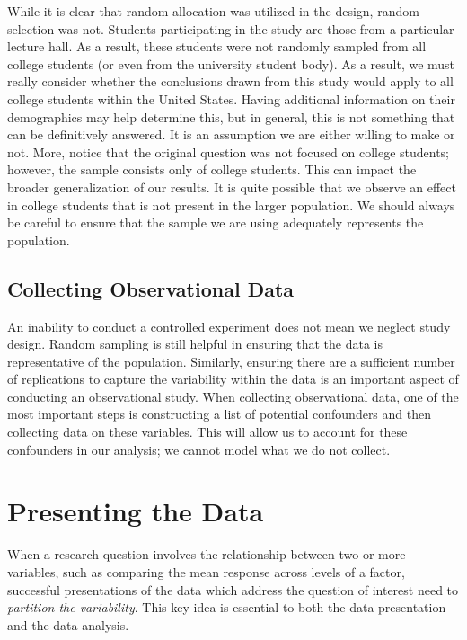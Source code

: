 \documentclass[
]{book}
\theoremstyle{plain}
\theoremstyle{mydefn}
\theoremstyle{myexmpl}
\theoremstyle{remark}
\begin{document}
While it is clear that random allocation was utilized in the design, random selection was not. Students participating in the study are those from a particular lecture hall. As a result, these students were not randomly sampled from all college students (or even from the university student body). As a result, we must really consider whether the conclusions drawn from this study would apply to all college students within the United States. Having additional information on their demographics may help determine this, but in general, this is not something that can be definitively answered. It is an assumption we are either willing to make or not. More, notice that the original question was not focused on college students; however, the sample consists only of college students. This can impact the broader generalization of our results. It is quite possible that we observe an effect in college students that is not present in the larger population. We should always be careful to ensure that the sample we are using adequately represents the population.

\hypertarget{collecting-observational-data}{%
\section{Collecting Observational Data}\label{collecting-observational-data}}

An inability to conduct a controlled experiment does not mean we neglect study design. Random sampling is still helpful in ensuring that the data is representative of the population. Similarly, ensuring there are a sufficient number of replications to capture the variability within the data is an important aspect of conducting an observational study. When collecting observational data, one of the most important steps is constructing a list of potential confounders and then collecting data on these variables. This will allow us to account for these confounders in our analysis; we cannot model what we do not collect.

\hypertarget{ANOVAsummaries}{%
\chapter{Presenting the Data}\label{ANOVAsummaries}}

When a research question involves the relationship between two or more variables, such as comparing the mean response across levels of a factor, successful presentations of the data which address the question of interest need to \emph{partition the variability}. This key idea is essential to both the data presentation and the data analysis.
\end{document}
